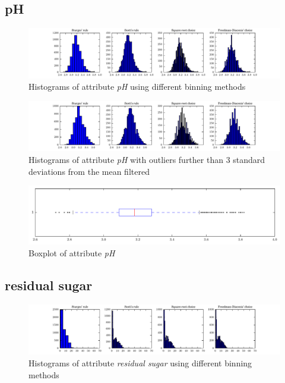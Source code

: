 \documentclass{report}
\begin{document}
\newpage\subsection{pH}
\begin{figure}[H]
\includegraphics[width=\textwidth]{histograms/pH.pdf}
\caption{Histograms of attribute \emph{pH} using different binning methods}\end{figure}

\begin{figure}[H]
\includegraphics[width=\textwidth]{histograms/pH_filtered.pdf}
\caption{Histograms of attribute \emph{pH} with outliers further than 3 standard deviations from the mean filtered}\n\end{figure}

\begin{figure}[H]
\includegraphics[width=\textwidth]{boxplots/pH.pdf}
\caption{Boxplot of attribute \emph{pH}}\end{figure}

\newpage\subsection{residual sugar}
\begin{figure}[H]
\includegraphics[width=\textwidth]{histograms/residual_sugar.pdf}
\caption{Histograms of attribute \emph{residual sugar} using different binning methods}\end{figure}
\end{document}
